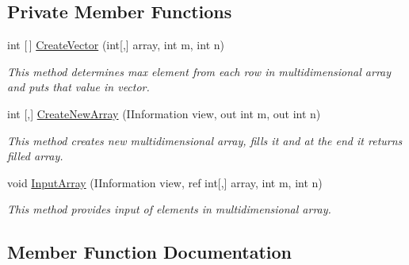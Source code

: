\subsection*{Private Member Functions}
\begin{DoxyCompactItemize}
\item 
int \mbox{[}$\,$\mbox{]} \mbox{\hyperlink{class_home_work_1_1_task_library_1_1_tasks_1_1_lesson4_1_1_task4_a14f5f16786b61bfee08560a2f80874c6}{Create\+Vector}} (int\mbox{[},\mbox{]} array, int m, int n)
\begin{DoxyCompactList}\small\item\em This method determines max element from each row in multidimensional array and puts that value in vector. \end{DoxyCompactList}\item 
int \mbox{[},\mbox{]} \mbox{\hyperlink{class_home_work_1_1_task_library_1_1_tasks_1_1_lesson4_1_1_task4_aaf4af72236f080a172ed92bb35ef82f2}{Create\+New\+Array}} (I\+Information view, out int m, out int n)
\begin{DoxyCompactList}\small\item\em This method creates new multidimensional array, fills it and at the end it returns filled array. \end{DoxyCompactList}\item 
void \mbox{\hyperlink{class_home_work_1_1_task_library_1_1_tasks_1_1_lesson4_1_1_task4_ad7d3fa93f7e1647e3a3ac11d2c7f7afb}{Input\+Array}} (I\+Information view, ref int\mbox{[},\mbox{]} array, int m, int n)
\begin{DoxyCompactList}\small\item\em This method provides input of elements in multidimensional array. \end{DoxyCompactList}\end{DoxyCompactItemize}


\subsection{Member Function Documentation}
\mbox{\label{class_home_work_1_1_task_library_1_1_tasks_1_1_lesson4_1_1_task4_aaf4af72236f080a172ed92bb35ef82f2}} 
